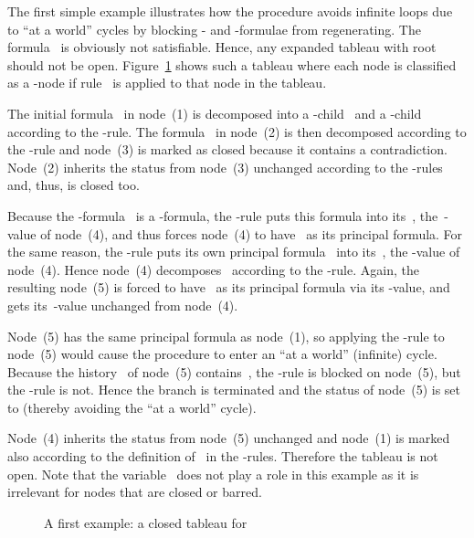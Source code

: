 \documentclass{entcs}
\newcommand{\fean}{}
\newcommand{\trand}{}
\newcommand{\trei}{}
\newcommand{\trero}{}
\newcommand{\trert}{}
\begin{document}
\begin{center}
The first simple example illustrates
how the procedure avoids infinite loops due to ``at a world'' cycles
by blocking - and -formulae from regenerating.
The formula~ is obviously not satisfiable.
Hence, any expanded tableau with root~ should not be open.
Figure~\ref{fig_ex2} shows such a tableau
where each node is classified as a -node
if rule~ is applied to that node in the tableau.

The initial formula~ in node~(1) 
is decomposed into a -child~
and a -child~
according to the \trero{}-rule.
The formula~ in node~(2) is then decomposed
according to the \trand{}-rule and node~(3) is marked as closed
because it contains a contradiction.
Node~(2) inherits the status from node~(3) unchanged 
according to the -rules
and, thus, is closed too.

Because the -formula~ is a \fean{}-formula,
the \trero{}-rule puts this formula into its~,
the~-value of node~(4),
and thus forces node~(4) to have~ as its principal formula.
For the same reason, 
the \trero{}-rule puts its own principal formula~
into its~, the -value of node~(4).
Hence node~(4) decomposes~ according to the \trei{}-rule.
Again, the resulting node~(5) is forced to have~ as its principal formula
via its -value, and gets its~-value unchanged from node~(4).

Node~(5) has the same principal formula as node~(1),
so applying the \trero{}-rule to node~(5) would cause
the procedure to enter an ``at a world'' (infinite) cycle.
Because the history~ of node~(5) contains~,
the \trero{}-rule is blocked on node~(5),
but the \trert{}-rule is not.
Hence the branch is terminated and the status of node~(5) is set to 
(thereby avoiding the ``at a world'' cycle).

Node~(4) inherits the status from node~(5) unchanged
and node~(1) is marked  also
according to the definition of~ in the -rules.
Therefore the tableau is not open.
Note that the variable~ does not play a role in this example
as it is irrelevant for nodes that are closed or barred.
\begin{figure}
  \begin{center}
    
  \end{center}
  \caption[]{A first example: a closed tableau for~}
  \label{fig_ex2}
\end{figure}



\end{center}
\end{document}
